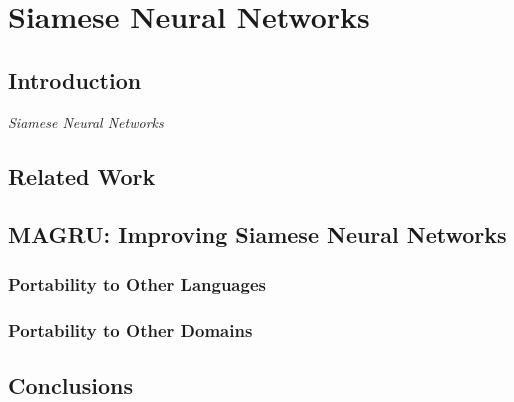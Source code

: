 \chapter{\label{cha:sts_siamese_neural_networks}Siamese Neural Networks}

\section{Introduction}
\cite{ranasinghe-etal-2019-semantic}
\textit{Siamese Neural Networks}
\section{Related Work}

\section{MAGRU: Improving Siamese Neural Networks}

\subsection{Portability to Other Languages}

\subsection{Portability to Other Domains}

\section{Conclusions}
